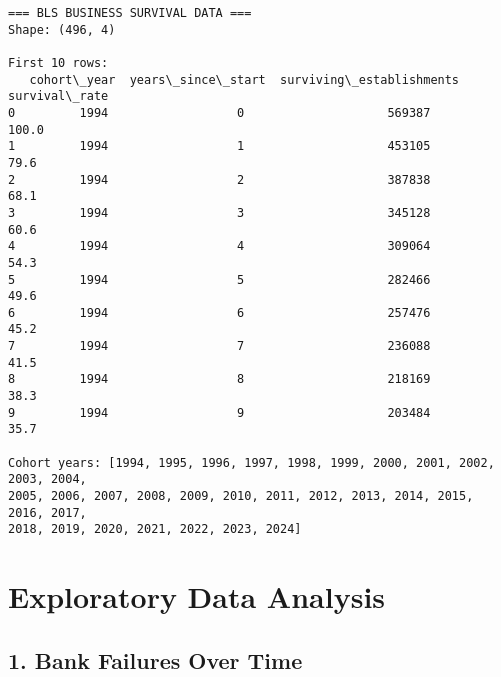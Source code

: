 \documentclass[11pt]{article}
\begin{document}
    \begin{Verbatim}[commandchars=\\\{\}]
=== BLS BUSINESS SURVIVAL DATA ===
Shape: (496, 4)

First 10 rows:
   cohort\_year  years\_since\_start  surviving\_establishments  survival\_rate
0         1994                  0                    569387          100.0
1         1994                  1                    453105           79.6
2         1994                  2                    387838           68.1
3         1994                  3                    345128           60.6
4         1994                  4                    309064           54.3
5         1994                  5                    282466           49.6
6         1994                  6                    257476           45.2
7         1994                  7                    236088           41.5
8         1994                  8                    218169           38.3
9         1994                  9                    203484           35.7

Cohort years: [1994, 1995, 1996, 1997, 1998, 1999, 2000, 2001, 2002, 2003, 2004,
2005, 2006, 2007, 2008, 2009, 2010, 2011, 2012, 2013, 2014, 2015, 2016, 2017,
2018, 2019, 2020, 2021, 2022, 2023, 2024]
    \end{Verbatim}

    \hypertarget{exploratory-data-analysis}{%
\section{Exploratory Data Analysis}\label{exploratory-data-analysis}}

    \hypertarget{bank-failures-over-time}{%
\subsection{1. Bank Failures Over Time}\label{bank-failures-over-time}}
\end{document}
